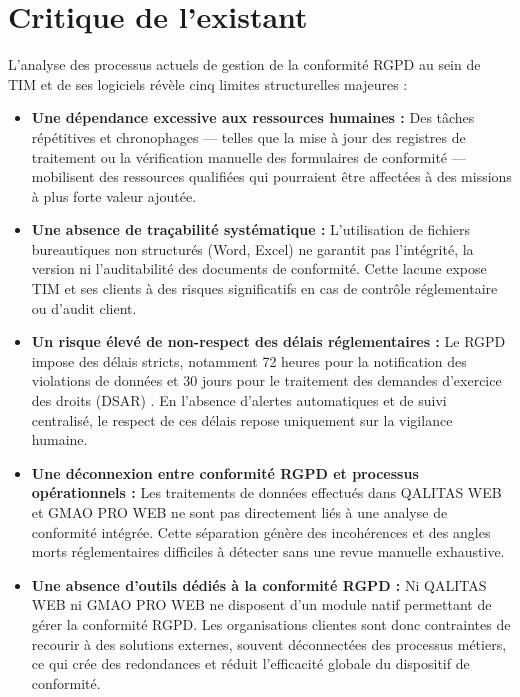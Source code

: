 \documentclass[12pt,a4paper]{report}
\begin{document}
\section{Critique de l'existant}

L'analyse des processus actuels de gestion de la conformité RGPD au sein de TIM et de ses logiciels révèle cinq limites structurelles majeures :

\begin{itemize}[leftmargin=*, label=\textbullet]

    \item \textbf{Une dépendance excessive aux ressources humaines :} Des tâches répétitives et chronophages --- telles que la mise à jour des registres de traitement ou la vérification manuelle des formulaires de conformité --- mobilisent des ressources qualifiées qui pourraient être affectées à des missions à plus forte valeur ajoutée.

    \item \textbf{Une absence de traçabilité systématique :} L'utilisation de fichiers bureautiques non structurés (Word, Excel) ne garantit pas l'intégrité, la version ni l'auditabilité des documents de conformité. Cette lacune expose TIM et ses clients à des risques significatifs en cas de contrôle réglementaire ou d'audit client.

    \item \textbf{Un risque élevé de non-respect des délais réglementaires :} Le RGPD impose des délais stricts, notamment 72 heures pour la notification des violations de données et 30 jours pour le traitement des demandes d'exercice des droits (DSAR) \cite{rgpd}. En l'absence d'alertes automatiques et de suivi centralisé, le respect de ces délais repose uniquement sur la vigilance humaine.

    \item \textbf{Une déconnexion entre conformité RGPD et processus opérationnels :} Les traitements de données effectués dans QALITAS WEB et GMAO PRO WEB ne sont pas directement liés à une analyse de conformité intégrée. Cette séparation génère des incohérences et des angles morts réglementaires difficiles à détecter sans une revue manuelle exhaustive.

    \item \textbf{Une absence d'outils dédiés à la conformité RGPD :} Ni QALITAS WEB ni GMAO PRO WEB ne disposent d'un module natif permettant de gérer la conformité RGPD. Les organisations clientes sont donc contraintes de recourir à des solutions externes, souvent déconnectées des processus métiers, ce qui crée des redondances et réduit l'efficacité globale du dispositif de conformité.

\end{itemize}
\end{document}
